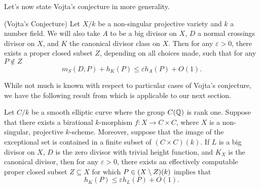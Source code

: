 Let's now state Vojta's conjecture in more generality.

\begin{conjecture}(Vojta's Conjecture)
    Let $X/k$ be a non-singular projective variety and $k$ a number field.
    We will also take $A$ to be a big divisor on $X$, 
    $D$ a normal crossings divisor on $X$,
    and $K$ the canonical divisor class on $X$.
    Then for any $\varepsilon > 0$,
    there exists a proper closed subset $Z$,
    depending on all choices made,
    such that for any $P \notin Z$
    \[
        m_S(D, P) + h_{K}(P) \leq \varepsilon h_A(P) + O(1).
    \]
\end{conjecture}

While not much is known with respect to particular cases of Vojta's conjecture,
we have the following result from \cite{McKinnon_2003} which is applicable to our next section.

\begin{theorem}
    Let $C/k$ be a smooth elliptic curve where the group $C(\mathbb{Q})$ is rank one.
    Suppose that there exists a birational $k$-morphism $f : X \to C \times C$,
    where $X$ is a non-singular, projective $k$-scheme.
    Moreover, suppose that the image of the exceptional set is contained in a finite subset of $(C \times C)(k)$.
    If $L$ is a big divisor on $X$,
    $D$ is the zero divisor with trivial height function,
    and $K_X$ is the canonical divisor,
    then for any $\varepsilon > 0$,
    there exists an effectively computable proper closed subset $Z \subseteq X$ for which $P \in (X \setminus Z)(k)$ implies that
    \[
        h_K(P) \leq \varepsilon h_L(P) + O(1).
    \]
\end{theorem}

